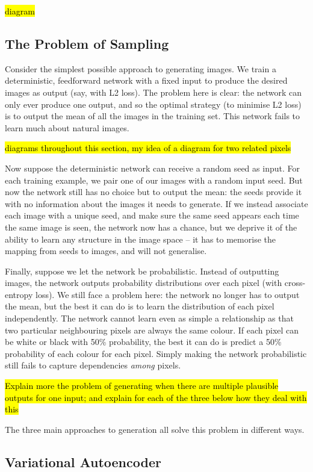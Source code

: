 \documentclass[10pt,a4paper]{article}
\begin{document}
\hl{diagram}

\subsection{The Problem of Sampling}

Consider the simplest possible approach to generating images. We train a deterministic, feedforward network with a fixed input to produce the desired images as output (say, with L2 loss). The problem here is clear: the network can only ever produce one output, and so the optimal strategy (to minimise L2 loss) is to output the mean of all the images in the training set. This network fails to learn much about natural images.

\hl{diagrams throughout this section, my idea of a diagram for two related pixels}

Now suppose the deterministic network can receive a random seed as input. For each training example, we pair one of our images with a random input seed. But now the network still has no choice but to output the mean: the seeds provide it with no information about the images it needs to generate. If we instead associate each image with a unique seed, and make sure the same seed appears each time the same image is seen, the network now has a chance, but we deprive it of the ability to learn any structure in the image space -- it has to memorise the mapping from seeds to images, and will not generalise.

Finally, suppose we let the network be probabilistic. Instead of outputting images, the network outputs probability distributions over each pixel (with cross-entropy loss). We still face a problem here: the network no longer has to output the mean, but the best it can do is to learn the distribution of each pixel independently. The network cannot learn even as simple a relationship as that two particular neighbouring pixels are always the same colour. If each pixel can be white or black with 50\% probability, the best it can do is predict a 50\% probability of each colour for each pixel. Simply making the network probabilistic still fails to capture dependencies \emph{among} pixels.

\hl{Explain more the problem of generating when there are multiple plausible outputs for one input; and explain for each of the three below how they deal with this}

The three main approaches to generation all solve this problem in different ways.

\subsection{Variational Autoencoder}
\end{document}
